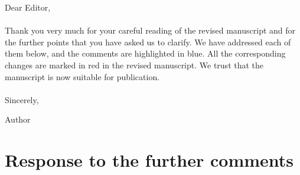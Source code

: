 \documentclass[aps,prb,onecolumn,nofootinbib,citeautoscript,10pt]{revtex4-2}
\begin{document}
\noindent Dear Editor,\\
\\ \noindent Thank you very much for your careful reading of the revised manuscript and for the further points that you have asked us to clarify. We have addressed each of them below, and the comments are highlighted in blue. All the corresponding changes are marked in red in the revised manuscript. We trust that the manuscript is now suitable for publication.
\\\\ \noindent Sincerely,

\noindent Author

\vspace{0.5 cm}

\section{Response to the further comments}
\end{document}
